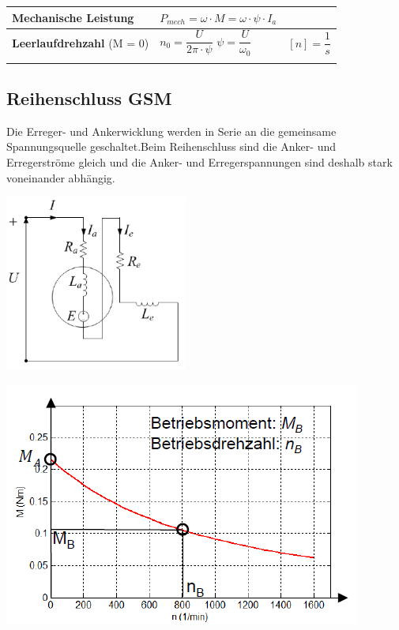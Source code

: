 \begin{longtable}{| p{} | p{} | p{} |}
    	\textbf{Mechanische Leistung} &
        $P_{mech} = \omega\cdot M = \omega\cdot\psi\cdot I_a$ &
        \\ \hline
        
    	\textbf{Leerlaufdrehzahl}\newline\newline
        (M = 0)&
        $n_0 = \dfrac{U}{2\pi\cdot\psi}$\newline
        $ \psi = \dfrac{U}{\omega_0} $&
        $[n] = \dfrac{1}{s}$
        \\ \lasthline
    \end{longtable}
    \clearpage
    \newpage

\subsection{Reihenschluss GSM}
    Die Erreger- und Ankerwicklung werden in Serie an die gemeinsame Spannungsquelle geschaltet.\newline Beim Reihenschluss sind die Anker- und Erregerströme gleich und die Anker- und Erregerspannungen sind deshalb  stark voneinander abhängig.\newline
    \begin{minipage}[b]{0.4\textwidth}
    	\raggedright
    	\includegraphics[width=6cm]{images/Reihenschluss.png}
    \end{minipage}
    \begin{minipage}[b]{0.5\textwidth}
    	\raggedright
    	\includegraphics[scale = 0.8]{images/KennlinieReihenschluss1}
    \end{minipage}\\
